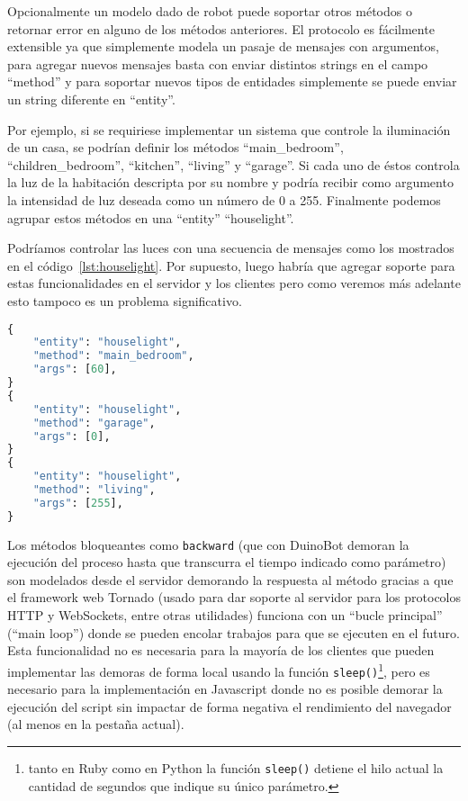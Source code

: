 Opcionalmente un modelo dado de robot puede soportar otros métodos o retornar
error en alguno de los métodos anteriores. El protocolo es fácilmente
extensible ya que simplemente modela un pasaje de mensajes con argumentos,
para agregar nuevos mensajes basta con enviar distintos strings en el
campo ``method'' y para soportar nuevos tipos de entidades simplemente
se puede enviar un string diferente en ``entity''.

Por ejemplo, si se requiriese implementar
un sistema que controle la iluminación de un casa,
se podrían definir los métodos ``main\_bedroom'', ``children\_bedroom'',
``kitchen'', ``living'' y ``garage''. Si cada uno de éstos
controla la luz de la habitación descripta por su nombre y podría recibir
como
argumento la intensidad de luz deseada como un número de 0 a 255. Finalmente
podemos agrupar estos métodos en una ``entity'' ``houselight''.

Podríamos controlar las luces con una secuencia de mensajes como
los mostrados en el código~\ref{lst:houselight}. Por supuesto, luego
habría que agregar soporte para estas funcionalidades en el servidor
y los clientes pero como veremos más adelante esto tampoco es
un problema significativo.

\begin{lstlisting}[language=python,
caption={Ejemplo de una posible extensión al protocolo para controlar
las luces de una casa},
label=lst:houselight]
{
    "entity": "houselight",
    "method": "main_bedroom",
    "args": [60],
}
{
    "entity": "houselight",
    "method": "garage",
    "args": [0],
}
{
    "entity": "houselight",
    "method": "living",
    "args": [255],
}
\end{lstlisting}


Los métodos bloqueantes como \texttt{backward} (que con DuinoBot demoran
la ejecución del proceso hasta que transcurra el tiempo indicado como
parámetro) son modelados desde el servidor demorando la respuesta al método
gracias a que el framework web Tornado (usado para dar soporte al servidor
para los protocolos HTTP y WebSockets, entre otras utilidades)
funciona con un ``bucle principal''
(``main loop'') donde se pueden encolar trabajos para que se ejecuten
en el futuro.
Esta funcionalidad no es necesaria para la mayoría de los clientes que
pueden implementar las demoras de forma local usando la función
\texttt{sleep()}\footnote{tanto en Ruby como en Python la función \texttt{sleep()} detiene
el hilo actual la cantidad de segundos que indique su único parámetro.},
pero es necesario para la implementación en Javascript donde no es posible
demorar la ejecución del script sin impactar de forma negativa el rendimiento
del navegador (al menos en la pestaña actual).



